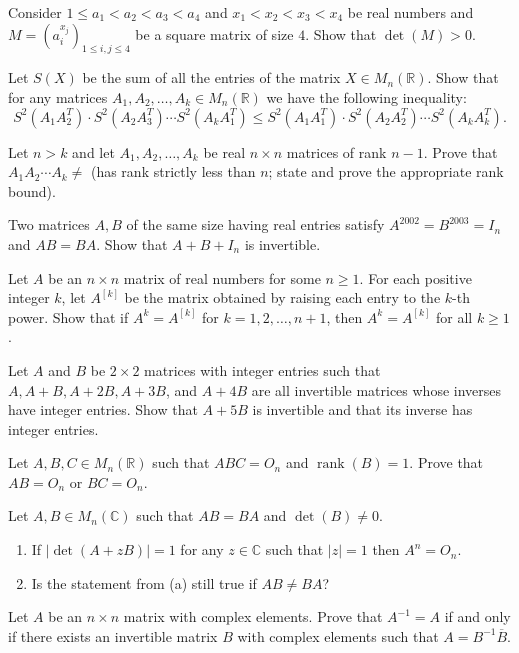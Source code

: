 \documentclass[12pt]{article}
\begin{document}
\begin{problems}
\item Consider $1\le a_1<a_2<a_3<a_4$ and $x_1<x_2<x_3<x_4$ be real numbers and $M = (a_i^{x_j})_{1\le i,j\le 4}$ be a square matrix of size $4$. Show that $\det(M)>0$.

\item Let $S(X)$ be the sum of all the entries of the matrix $X\in M_n(\mathbb{R})$. Show that for any matrices $A_1,A_2,\dots,A_k\in M_n(\mathbb{R})$ we have the following inequality:
\[
S^2(A_1A_2^T)\cdot S^2(A_2A_3^T) \cdots S^2(A_kA_1^T) \le S^2(A_1A_1^T)\cdot S^2(A_2A_2^T)\cdots S^2(A_kA_k^T).
\]

\item Let $n>k$ and let $A_1,A_2,\dots,A_k$ be real $n\times n$ matrices of rank $n-1$. Prove that $A_1A_2\cdots A_k \ne$ (has rank strictly less than $n$; state and prove the appropriate rank bound).

\item Two matrices $A,B$ of the same size having real entries satisfy $A^{2002}=B^{2003}=I_n$ and $AB=BA$. Show that $A+B+I_n$ is invertible.

\item Let $A$ be an $n\times n$ matrix of real numbers for some $n\ge 1$. For each positive integer $k$, let $A^{[k]}$ be the matrix obtained by raising each entry to the $k$-th power. Show that if $A^k=A^{[k]}$ for $k=1,2,\dots,n+1$, then $A^k=A^{[k]}$ for all $k\ge 1$.

\item Let $A$ and $B$ be $2\times 2$ matrices with integer entries such that $A,A+B,A+2B,A+3B$, and $A+4B$ are all invertible matrices whose inverses have integer entries. Show that $A+5B$ is invertible and that its inverse has integer entries.

\item Let $A,B,C\in M_n(\mathbb{R})$ such that $ABC=O_n$ and $\operatorname{rank}(B)=1$. Prove that $AB=O_n$ or $BC=O_n$.

\item Let $A,B\in M_n(\mathbb{C})$ such that $AB=BA$ and $\det(B)\ne 0$.
\begin{enumerate}[label=(\alph*)]
\item If $|\det(A+zB)|=1$ for any $z\in\mathbb{C}$ such that $|z|=1$ then $A^n=O_n$.
\item Is the statement from (a) still true if $AB\ne BA$?
\end{enumerate}

\item Let $A$ be an $n\times n$ matrix with complex elements. Prove that $A^{-1}=A$ if and only if there exists an invertible matrix $B$ with complex elements such that $A=B^{-1}\overline{B}$.


\end{problems}
\end{document}
